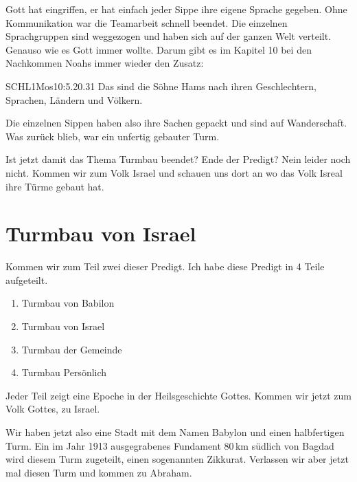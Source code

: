 \documentclass[12pt]{../../inc/mybib}
\newenvironment{block}[1][]{%
  \vspace{1.5em}%
  \noindent\textbf{#1}\par%
  \vspace{0.0em}%
}{%
  \vspace{1em}%
}
\begin{document}
\begin{block}
    Gott hat eingriffen, er hat einfach jeder Sippe ihre eigene Sprache gegeben. Ohne Kommunikation war die Teamarbeit schnell beendet. Die einzelnen Sprachgruppen sind weggezogen und haben sich auf der ganzen Welt verteilt. Genauso wie es Gott immer wollte.
    Darum gibt es im Kapitel 10 bei den Nachkommen Noahs immer wieder den Zusatz:
    \begin{bibelbox}{SCHL}{1Mos}{10:5.20.31}
        Das sind die Söhne Hams nach ihren Geschlechtern, Sprachen, Ländern und Völkern.
    \end{bibelbox}    
    
    Die einzelnen Sippen haben also ihre Sachen gepackt und sind auf Wanderschaft. Was zurück blieb, war ein unfertig gebauter Turm.
\end{block}
\begin{block}
    Ist jetzt damit das Thema Turmbau beendet? Ende der Predigt? Nein leider noch nicht. Kommen wir zum Volk Israel und schauen uns dort an wo das Volk Isreal ihre Türme gebaut hat.
    
    \section{Turmbau von Israel}
    Kommen wir zum Teil zwei dieser Predigt. Ich habe diese Predigt in 4 Teile aufgeteilt.  
    \begin{enumerate}
        \item Turmbau von Babilon
        \item Turmbau von Israel
        \item Turmbau der Gemeinde
        \item Turmbau Persönlich
    \end{enumerate}
    Jeder Teil zeigt eine Epoche in der Heilsgeschichte Gottes. Kommen wir jetzt zum Volk Gottes, zu Israel.
\end{block}
\begin{block}
    Wir haben jetzt also eine Stadt mit dem Namen Babylon und einen halbfertigen Turm. Ein im Jahr 1913 ausgegrabenes Fundament 80\,km südlich von Bagdad wird diesem Turm zugeteilt, einen sogenannten Zikkurat. Verlassen wir aber jetzt mal diesen Turm und kommen zu Abraham.
\end{block}
\end{document}
